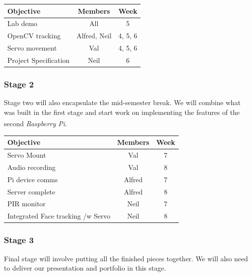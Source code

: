 \documentclass[11pt,a4paper,titlepage]{report}
\newcommand{\rpi}{\textit{Raspberry Pi\textsuperscript{\textregistered}}}
\begin{document}
\begin{table}[H]
\begin{tabular}{|l|c|c|}
    \hline
    \textbf{Objective} & \textbf{Members} & \textbf{Week} \\ \hline
    
    Lab demo & All & 5 \\ \hline
    OpenCV tracking & Alfred, Neil & 4, 5, 6 \\ \hline
    Servo movement & Val & 4, 5, 6 \\ \hline
    Project Specification & Neil & 6 \\ \hline

\end{tabular}
\end{table}

\subsubsection{Stage 2}

Stage two will also encapsulate the mid-semester break. We will combine what was built in the first stage and start work on implementing the features of the second \rpi.

\begin{center}
\begin{table}[H]
\begin{tabular}{|l|c|c|}
    \hline
    \textbf{Objective} & \textbf{Members} & \textbf{Week} \\ \hline
    
    Servo Mount & Val & 7 \\ \hline
    Audio recording & Val & 8 \\ \hline
    Pi device comms & Alfred & 7 \\ \hline
    Server complete & Alfred & 8 \\ \hline
    PIR monitor & Neil & 7 \\ \hline
    Integrated Face tracking /w Servo & Neil & 8 \\ \hline


\end{tabular}
\end{table}
\end{center}


\subsubsection{Stage 3}

Final stage will involve putting all the finished pieces together. We will also need to deliver our presentation and portfolio in this stage.
\end{document}
